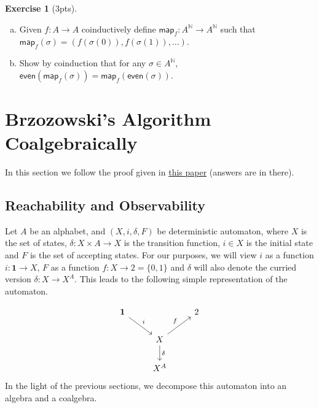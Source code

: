 \documentclass{article}
\theoremstyle{definition}
\newtheorem{exer}{Exercise}
\theoremstyle{remark}
\newcommand{\N}{\mathbb{N}}
\newcommand{\sfeven}{\textsf{even}}
\begin{document}
\begin{exer}[3pts]
    \begin{enumerate}[(a)]
        \item Given $f:A \rightarrow A$ coinductively define $\textsf{map}_f: A^\N \rightarrow A^\N$ such that $\textsf{map}_f(\sigma) = (f(\sigma(0)), f(\sigma(1)), \dots)$.
        \item Show by coinduction that for any $\sigma \in A^\N$, $\sfeven(\textsf{map}_f(\sigma)) = \textsf{map}_{f}(\sfeven(\sigma))$.
    \end{enumerate}
\end{exer}

\section{Brzozowski's Algorithm Coalgebraically}
In this section we follow the proof given in \href{https://dl.acm.org/doi/10.1145/2490818}{this paper} (answers are in there). 
\subsection{Reachability and Observability}
Let $A$ be an alphabet, and $(X, i, \delta, F)$ be deterministic automaton, where $X$ is the set of states, $\delta:X \times A \rightarrow X$ is the transition function, $i \in X$ is the initial state and $F$ is the set of accepting states. For our purposes, we will view $i$ as a function $i: \mathbf{1} \rightarrow X$, $F$ as a function $f: X \rightarrow 2 = \{0,1\}$ and $\delta$ will also denote the curried version $\delta: X \rightarrow X^A$. This leads to the following simple representation of the automaton.

\begin{equation}\label{diag-dfa}
	\begin{tikzcd}
 \mathbf{1} \arrow[rd, "i"] & & 2 \\
 & X \arrow[d, "\delta"] \arrow[ru, "f"] & \\
 & X^A & 
 \end{tikzcd}
\end{equation}
In the light of the previous sections, we decompose this automaton into an algebra and a coalgebra.
\end{document}
